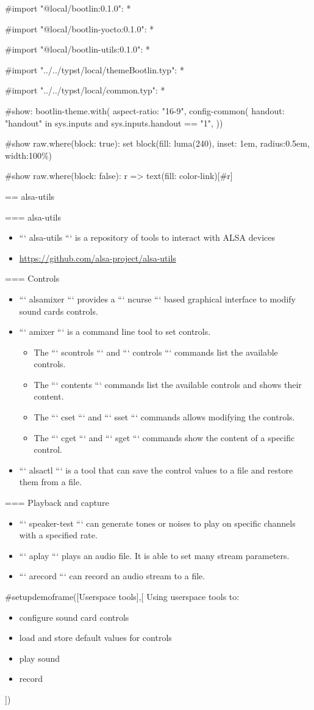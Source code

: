 #import "@local/bootlin:0.1.0": * 

#import "@local/bootlin-yocto:0.1.0": *

#import "@local/bootlin-utils:0.1.0": *

#import "../../typst/local/themeBootlin.typ": *

#import "../../typst/local/common.typ": *

#show: bootlin-theme.with(
  aspect-ratio: "16-9",
config-common(
  handout: "handout" in sys.inputs and sys.inputs.handout == "1",
))

#show raw.where(block: true): set block(fill: luma(240), inset: 1em, radius:0.5em, width:100\%) 

#show raw.where(block: false): r => { text(fill: color-link)[#r] } 

 == alsa-utils

=== {alsa-utils}
  \begin{itemize}
  \item ``` alsa-utils ``` is a repository of tools to interact with
    ALSA devices
  \item \url{https://github.com/alsa-project/alsa-utils}
  \end{itemize}


=== {Controls}
  \begin{itemize}
  \item ``` alsamixer ``` provides a ``` ncurse ``` based graphical
    interface to modify sound cards controls.
  \item ``` amixer ``` is a command line tool to set controls.
    \begin{itemize}
    \item The ``` scontrols ``` and ``` controls ``` commands list the
      available controls.
    \item The ``` contents ``` commands list the
      available controls and shows their content.
    \item The ``` cset ``` and ``` sset ``` commands allows modifying
      the controls.
    \item The ``` cget ``` and ``` sget ``` commands show the content of
      a specific control.
    \end{itemize}
  \item ``` alsactl ``` is a tool that can save the control values to a
    file and restore them from a file.
  \end{itemize}


=== {Playback and capture}
  \begin{itemize}
  \item ``` speaker-test ``` can generate tones or noises to play on
    specific channels with a specified rate.
  \item ``` aplay ``` plays an audio file. It is able to set many
    stream parameters.
  \item ``` arecord ``` can record an audio stream to a file.
  \end{itemize}


#setupdemoframe([Userspace tools],[
  Using userspace tools to:
  \begin{itemize}
  \item configure sound card controls
  \item load and store default values for controls
  \item play sound
  \item record
  \end{itemize}
])